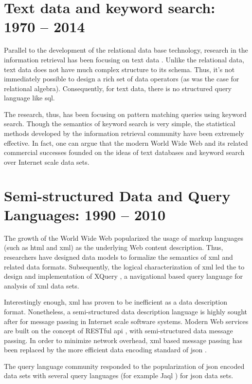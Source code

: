 	\section{Text data and keyword search:  1970 -- 2014}
		Parallel to the development of the relational data base technology, research in the information retrieval has been focusing on text data \cite{salton-88, jones-72}.  Unlike the relational data, text data does not have much complex structure to its schema.  Thus, it's not immediately possible to design a rich set of data operators (as was the case for relational algebra).  Consequently, for text data, there is no structured query language like \gls{sql}.
		
		The research, thus, has been focusing on pattern matching queries using keyword search.  Though the semantics of keyword search is very simple, the statistical methods developed by the information retrieval community \cite{salton-88, robertson-09, dumais-88} have been extremely effective.  In fact, one can argue that the modern World Wide Web and its related commercial successes founded on the ideas of text databases and keyword search over Internet scale data sets.
		
	\section{Semi-structured Data and Query Languages:  1990 -- 2010}
		The growth of the World Wide Web popularized the usage of markup languages (such as \gls{html} and \gls{xml}) as the underlying Web content description.  Thus, researchers have designed data models \cite{suciu-98} to formalize the semantics of \gls{xml} and related data formats.  Subsequently, the logical characterization of \gls{xml} led the to design and implementation of XQuery \cite{xquery}, a navigational based query language for analysis of \gls{xml} data sets.
		
		Interestingly enough, \gls{xml} has proven to be inefficient as a data description format.  Nonetheless, a semi-structured data description language is highly sought after for message passing in Internet scale software systems.  Modern Web services are built on the concept of RESTful \gls{api} \cite{restful-11}, with semi-structured data message passing.  In order to minimize network overhead, \gls{xml} based message passing has been replaced by the more efficient data encoding standard of \gls{json} \cite{json}.
		
		The query language community responded to the popularization of \gls{json} encoded data sets with several query languages \cite{simeon-13} (for example Jaql \cite{ibm-jaql}) for \gls{json} data sets.
	
